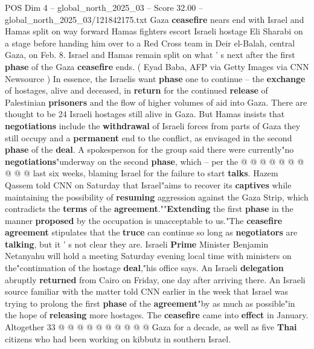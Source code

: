 \begin{textsample}{POS Dim 4 – global\_north\_2025\_03 – Score 32.00 – global\_north\_2025\_03/121842175.txt}  \label{ex:f4_pos_065}
Gaza \textbf{ceasefire} nears end with Israel and Hamas split on way forward Hamas fighters escort Israeli hostage Eli Sharabi on a stage before handing him over to a Red Cross team in Deir el-Balah, central Gaza, on Feb. 8.
Israel and Hamas remain split on what ' s next after the first \textbf{phase} of the Gaza \textbf{ceasefire} ends. ( Eyad Baba, AFP via Getty Images via CNN Newsource ) In essence, the Israelis want \textbf{phase} one to continue -- the \textbf{exchange} of hostages, alive and deceased, in \textbf{return} for the continued \textbf{release} of Palestinian \textbf{prisoners} and the flow of higher volumes of aid into Gaza.
There are thought to be 24 Israeli hostages still alive in Gaza.
But Hamas insists that \textbf{negotiations} include the \textbf{withdrawal} of Israeli forces from parts of Gaza they still occupy and a \textbf{permanent} end to the conflict, as envisaged in the second \textbf{phase} of the \textbf{deal}.
A spokesperson for the group said there were currently"no \textbf{negotiations}"underway on the second \textbf{phase}, which -- per the @ @ @ @ @ @ @ @ @ @ last six weeks, blaming Israel for the failure to start \textbf{talks}.
Hazem Qassem told CNN on Saturday that Israel"aims to recover its \textbf{captives} while maintaining the possibility of \textbf{resuming} aggression against the Gaza Strip, which contradicts the \textbf{terms} of the \textbf{agreement}.""\textbf{Extending} the first \textbf{phase} in the manner \textbf{proposed} by the occupation is unacceptable to us."The \textbf{ceasefire} \textbf{agreement} stipulates that the \textbf{truce} can continue so long as \textbf{negotiators} are \textbf{talking}, but it ' s not clear they are.
Israeli \textbf{Prime} Minister Benjamin Netanyahu will hold a meeting Saturday evening local time with ministers on the"continuation of the hostage \textbf{deal},"his office says.
An Israeli \textbf{delegation} abruptly \textbf{returned} from Cairo on Friday, one day after arriving there.
An Israeli source familiar with the matter told CNN earlier in the week that Israel was trying to prolong the first \textbf{phase} of the \textbf{agreement}"by as much as possible"in the hope of \textbf{releasing} more hostages.
The \textbf{ceasefire} came into \textbf{effect} in January.
Altogether 33 @ @ @ @ @ @ @ @ @ @ Gaza for a decade, as well as five \textbf{Thai} citizens who had been working on kibbutz in southern Israel.

\end{textsample}
